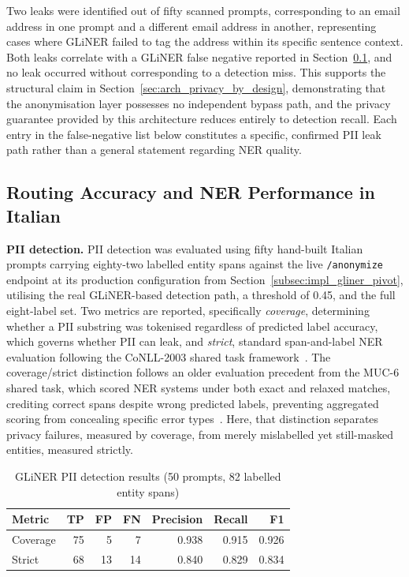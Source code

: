 Two leaks were identified out of fifty scanned prompts, corresponding to an email address in one prompt and a different email address in another, representing cases where GLiNER failed to tag the address within its specific sentence context. Both leaks correlate with a GLiNER false negative reported in Section~\ref{subsec:usecases_ner_performance}, and no leak occurred without corresponding to a detection miss. This supports the structural claim in Section~\ref{sec:arch_privacy_by_design}, demonstrating that the anonymisation layer possesses no independent bypass path, and the privacy guarantee provided by this architecture reduces entirely to detection recall. Each entry in the false-negative list below constitutes a specific, confirmed PII leak path rather than a general statement regarding NER quality.

\subsection{Routing Accuracy and NER Performance in Italian}
\label{subsec:usecases_ner_performance}

\textbf{PII detection.} PII detection was evaluated using fifty hand-built Italian prompts carrying eighty-two labelled entity spans against the live \texttt{/anonymize} endpoint at its production configuration from Section~\ref{subsec:impl_gliner_pivot}, utilising the real GLiNER-based detection path, a threshold of 0.45, and the full eight-label set. Two metrics are reported, specifically \emph{coverage}, determining whether a PII substring was tokenised regardless of predicted label accuracy, which governs whether PII can leak, and \emph{strict}, standard span-and-label NER evaluation following the CoNLL-2003 shared task framework~\cite{tjongkimsang2003conll}. The coverage/strict distinction follows an older evaluation precedent from the MUC-6 shared task, which scored NER systems under both exact and relaxed matches, crediting correct spans despite wrong predicted labels, preventing aggregated scoring from concealing specific error types~\cite{sundheim1995muc6}. Here, that distinction separates privacy failures, measured by coverage, from merely mislabelled yet still-masked entities, measured strictly.

\begin{table}[htbp]
\centering
\caption{GLiNER PII detection results (50 prompts, 82 labelled entity spans)}
\label{tab:gliner_metrics}
\begin{tabular}{lrrrrrr}
\hline
\textbf{Metric} & \textbf{TP} & \textbf{FP} & \textbf{FN} & \textbf{Precision} & \textbf{Recall} & \textbf{F1} \\
\hline
Coverage & 75 & 5 & 7 & 0.938 & 0.915 & 0.926 \\
Strict & 68 & 13 & 14 & 0.840 & 0.829 & 0.834 \\
\hline
\end{tabular}
\end{table}

